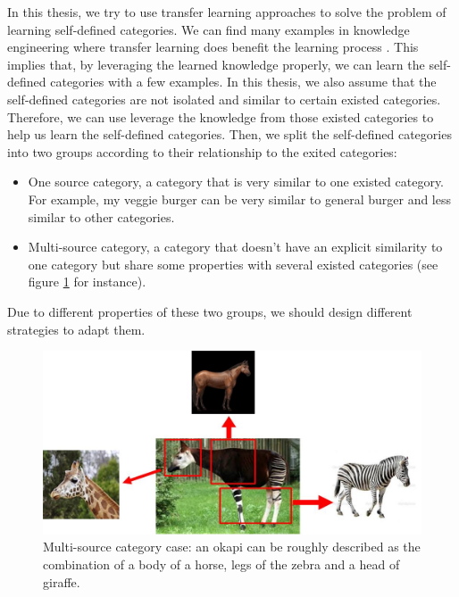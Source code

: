 In this thesis, we try to use transfer learning approaches to solve the problem of learning self-defined categories. We can find many examples in knowledge engineering where transfer learning does benefit the learning process \cite{pan2010survey}. This implies that, by leveraging the learned knowledge properly, we can learn the self-defined categories with a few examples. 
In this thesis, we also assume that the self-defined categories are not isolated and similar to certain existed categories. Therefore, we can use leverage the knowledge from those existed categories to help us learn the self-defined categories. Then, we split the self-defined categories into two groups according to their relationship to the exited categories: 
\begin{itemize}
	\item One source category, a category that is very similar to one existed category. For example, my veggie burger can be very similar to general burger and less similar to other categories.
	\item Multi-source category, a category that doesn't have an explicit similarity to one category but share some properties with several existed categories (see figure \ref{fig:intro:multi} for instance).
\end{itemize} 
Due to different properties of these two groups, we should design different strategies to adapt them.

\begin{figure}
	\centering
	\includegraphics[scale=.6]{introduction/fig/multiple.jpg}
	\caption{Multi-source category case: an okapi can be roughly described as the combination of a body of a horse, legs of the zebra and a head of giraffe.}\label{fig:intro:multi}
\end{figure}

